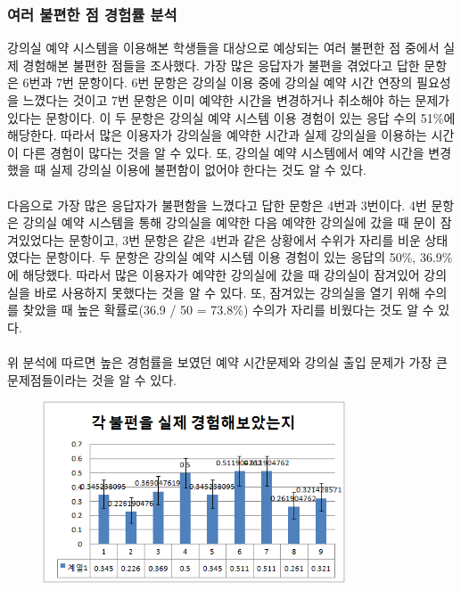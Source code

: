 \documentclass[11pt,a4paper]{article}
\begin{document}
\subsubsection{여러 불편한 점 경험률 분석}
강의실 예약 시스템을 이용해본 학생들을 대상으로 예상되는 여러 불편한 점 중에서 실제 경험해본 불편한 점들을 조사했다. 가장 많은 응답자가 불편을 겪었다고 답한 문항은 6번과 7번 문항이다. 6번 문항은 강의실 이용 중에 강의실 예약 시간 연장의 필요성을 느꼈다는 것이고 7번 문항은 이미 예약한 시간을 변경하거나 취소해야 하는 문제가 있다는 문항이다. 이 두 문항은 강의실 예약 시스템 이용 경험이 있는 응답 수의 51\%에 해당한다. 따라서 많은 이용자가 강의실을 예약한 시간과 실제 강의실을 이용하는 시간이 다른 경험이 많다는 것을 알 수 있다. 또, 강의실 예약 시스템에서 예약 시간을 변경했을 때 실제 강의실 이용에 불편함이 없어야 한다는 것도 알 수 있다.
\\
\\
다음으로 가장 많은 응답자가 불편함을 느꼈다고 답한 문항은 4번과 3번이다. 4번 문항은 강의실 예약 시스템을 통해 강의실을 예약한 다음 예약한 강의실에 갔을 때 문이 잠겨있었다는 문항이고, 3번 문항은 같은 4번과 같은 상황에서 수위가 자리를 비운 상태였다는 문항이다. 두 문항은 강의실 예약 시스템 이용 경험이 있는 응답의 50\%, 36.9\%에 해당했다. 따라서 많은 이용자가 예약한 강의실에 갔을 때 강의실이 잠겨있어 강의실을 바로 사용하지 못했다는 것을 알 수 있다. 또, 잠겨있는 강의실을 열기 위해 수의를 찾았을 때 높은 확률로(36.9 / 50 = 73.8\%) 수의가 자리를 비웠다는 것도 알 수 있다.
\\
\\
위 분석에 따르면 높은 경험률을 보였던 예약 시간문제와 강의실 출입 문제가 가장 큰 문제점들이라는 것을 알 수 있다.
\begin{figure}[h]
\includegraphics[width=0.8\textwidth]{4_1_2}
\centering
\end{figure}
\end{document}
